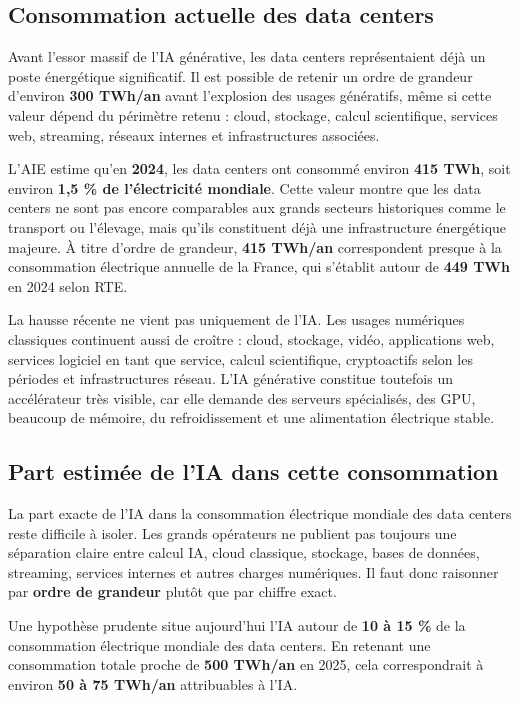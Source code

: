 \documentclass[
  10pt,
  a4paper,
  DIV=11,
  numbers=noendperiod,
  oneside]{scrreprt}
\let\oldtextbf\textbf
\renewcommand{\textbf}[1]{\oldtextbf{\textcolor{cmmnavy}{#1}}}
\begin{document}
\subsection{Consommation actuelle des data
centers}\label{consommation-actuelle-des-data-centers}

Avant l'essor massif de l'IA générative, les data centers représentaient
déjà un poste énergétique significatif. Il est possible de retenir un
ordre de grandeur d'environ \textbf{300 TWh/an} avant l'explosion des
usages génératifs, même si cette valeur dépend du périmètre retenu :
cloud, stockage, calcul scientifique, services web, streaming, réseaux
internes et infrastructures associées.

L'AIE estime qu'en \textbf{2024}, les data centers ont consommé environ
\textbf{415 TWh}, soit environ \textbf{1,5 \% de l'électricité
mondiale}. Cette valeur montre que les data centers ne sont pas encore
comparables aux grands secteurs historiques comme le transport ou
l'élevage, mais qu'ils constituent déjà une infrastructure énergétique
majeure. À titre d'ordre de grandeur, \textbf{415 TWh/an} correspondent
presque à la consommation électrique annuelle de la France, qui
s'établit autour de \textbf{449 TWh} en 2024 selon RTE.

La hausse récente ne vient pas uniquement de l'IA. Les usages numériques
classiques continuent aussi de croître : cloud, stockage, vidéo,
applications web, services logiciel en tant que service, calcul
scientifique, cryptoactifs selon les périodes et infrastructures réseau.
L'IA générative constitue toutefois un accélérateur très visible, car
elle demande des serveurs spécialisés, des GPU, beaucoup de mémoire, du
refroidissement et une alimentation électrique stable.

\subsection{Part estimée de l'IA dans cette
consommation}\label{part-estimuxe9e-de-lia-dans-cette-consommation}

La part exacte de l'IA dans la consommation électrique mondiale des data
centers reste difficile à isoler. Les grands opérateurs ne publient pas
toujours une séparation claire entre calcul IA, cloud classique,
stockage, bases de données, streaming, services internes et autres
charges numériques. Il faut donc raisonner par \textbf{ordre de
grandeur} plutôt que par chiffre exact.

Une hypothèse prudente situe aujourd'hui l'IA autour de \textbf{10 à 15
\%} de la consommation électrique mondiale des data centers. En retenant
une consommation totale proche de \textbf{500 TWh/an} en 2025, cela
correspondrait à environ \textbf{50 à 75 TWh/an} attribuables à l'IA.
\end{document}
